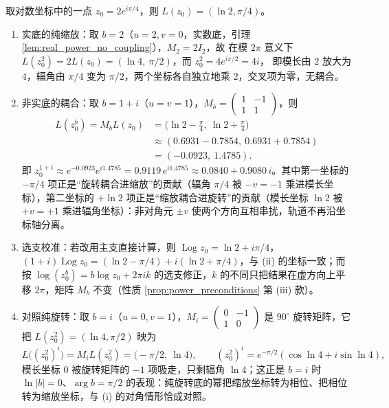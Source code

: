 \begin{example}[幂耦合的具体演算]\label{ex:power_coupling_example}
取对数坐标中的一点 $z_0=2e^{i\pi/4}$，则 $L(z_0)=(\ln 2,\pi/4)$。
\begin{enumerate}[label=(\roman*)]
    \item 实底的纯缩放：取 $b=2$（$u=2,v=0$，实数底，引理 \ref{lem:real_power_no_coupling}），$M_2=2I_2$，故
    在模 $2\pi$ 意义下 $L(z_0^2)=2L(z_0)=(\ln 4,\ \pi/2)$，而 $z_0^2=4e^{i\pi/2}=4i$，
    即模长由 $2$ 放大为 $4$，辐角由 $\pi/4$ 变为 $\pi/2$，两个坐标各自独立地乘 $2$，交叉项为零，无耦合。
    \item 非实底的耦合：取 $b=1+i$（$u=v=1$），$M_b=\begin{pmatrix}1&-1\\ 1&1\end{pmatrix}$，则
    \[
    \begin{aligned}
    L(z_0^b)=M_bL(z_0)&=\bigl(\ln 2-\tfrac{\pi}{4},\ \ln 2+\tfrac{\pi}{4}\bigr)\\
    &\approx(0.6931-0.7854,\ 0.6931+0.7854)\\
    &=(-0.0923,\ 1.4785).
    \end{aligned}
    \]
    即 $z_0^{1+i}\approx e^{-0.0923}e^{i1.4785}=0.9119\,e^{i1.4785}\approx0.0840+0.9080\,i$。其中第一坐标的 $-\pi/4$ 项正是“旋转耦合进缩放”的贡献（辐角 $\pi/4$ 被 $-v=-1$ 乘进模长坐标），第二坐标的 $+\ln 2$ 项正是“缩放耦合进旋转”的贡献（模长坐标 $\ln 2$ 被 $+v=+1$ 乘进辐角坐标）：非对角元 $\pm v$ 使两个方向互相串扰，轨道不再沿坐标轴分离。
    \item 选支校准：若改用主支直接计算，则 $\operatorname{Log}z_0=\ln 2+i\pi/4$，$(1+i)\operatorname{Log}z_0=(\ln 2-\pi/4)+i(\ln 2+\pi/4)$，与 (ii) 的坐标一致；而按 $\log(z_0^b)=b\log z_0+2\pi ik$ 的选支修正，$k$ 的不同只把结果在虚方向上平移 $2\pi$，矩阵 $M_b$ 不变（性质 \ref{prop:power_preconditions} 第 (iii) 款）。
    \item 对照纯旋转：取 $b=i$（$u=0,v=1$），$M_i=\begin{pmatrix}0&-1\\ 1&0\end{pmatrix}$ 是 $90^\circ$ 旋转矩阵，它把 $L(z_0^2)=(\ln 4,\pi/2)$ 映为
    \[
    L\bigl((z_0^2)^i\bigr)=M_iL(z_0^2)=\bigl(-\pi/2,\ \ln 4\bigr),\qquad (z_0^2)^i=e^{-\pi/2}(\cos\ln 4+i\sin\ln 4),
    \]
    模长坐标 $0$ 被旋转矩阵的 $-1$ 项吸走，只剩辐角 $\ln 4$；这正是 $b=i$ 时 $\ln|b|=0$、$\arg b=\pi/2$ 的表现：纯旋转底的幂把缩放坐标转为相位、把相位转为缩放坐标，与 (i) 的对角情形恰成对照。
\end{enumerate}
\end{example}

